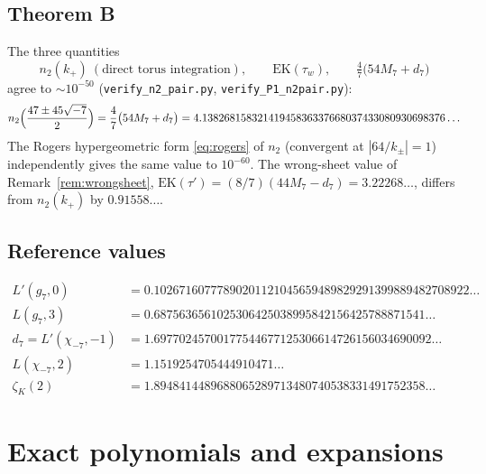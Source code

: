 \documentclass[11pt]{article}
\theoremstyle{definition}
\theoremstyle{remark}
\begin{document}
\subsection{Theorem B}

The three quantities
\[
  n_2(k_+)\ (\text{direct torus integration}),\qquad
  \mathrm{EK}(\tau_w),\qquad
  \tfrac47\bigl(54M_7+d_7\bigr)
\]
agree to $\sim10^{-50}$ (\texttt{verify\_n2\_pair.py},
\texttt{verify\_P1\_n2pair.py}):
\[
  n_2\Bigl(\frac{47\pm45\sqrt{-7}}2\Bigr)
  =\frac47\bigl(54M_7+d_7\bigr)
  =4.13826815832141945836337668037433080930698376\ldots
\]
The Rogers hypergeometric form \eqref{eq:rogers} of $n_2$ (convergent at
$|64/k_\pm|=1$) independently gives the same value to $10^{-60}$. The
wrong-sheet value of Remark~\ref{rem:wrongsheet},
$\mathrm{EK}(\tau')=(8/7)(44M_7-d_7)=3.22268\ldots$, differs from
$n_2(k_+)$ by $0.91558\ldots$.

\subsection{Reference values}

\begin{align*}
  L'(g_7,0)&=0.10267160777890201121045659489829291399889482708922\ldots\\
  L(g_7,3)&=0.6875636561025306425038995842156425788871541\ldots\\
  d_7=L'(\chi_{-7},-1)&=1.69770245700177544677125306614726156034690092\ldots\\
  L(\chi_{-7},2)&=1.1519254705444910471\ldots\\
  \zeta_K(2)&=1.8948414489688065289713480740538331491752358\ldots
\end{align*}

\appendix

\section{Exact polynomials and expansions}\label{app:poly}
\end{document}
